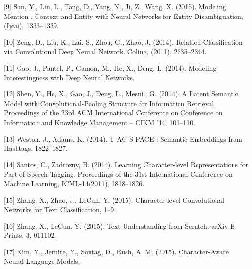 \documentclass{article}
\begin{document}
    [9] Sun, Y., Lin, L., Tang, D., Yang, N., Ji, Z.,  Wang, X. (2015). Modeling Mention , Context and Entity with Neural Networks for Entity Disambiguation, (Ijcai), 1333–1339.

    [10] Zeng, D., Liu, K., Lai, S., Zhou, G.,  Zhao, J. (2014). Relation Classification via Convolutional Deep Neural Network. Coling, (2011), 2335–2344. 

    [11] Gao, J., Pantel, P., Gamon, M., He, X.,  Deng, L. (2014). Modeling Interestingness with Deep Neural Networks.

    [12] Shen, Y., He, X., Gao, J., Deng, L.,  Mesnil, G. (2014). A Latent Semantic Model with Convolutional-Pooling Structure for Information Retrieval. Proceedings of the 23rd ACM International Conference on Conference on Information and Knowledge Management – CIKM ’14, 101–110.

    [13] Weston, J.,  Adams, K. (2014).  T AG S PACE : Semantic Embeddings from Hashtags, 1822–1827.

    [14] Santos, C.,  Zadrozny, B. (2014). Learning Character-level Representations for Part-of-Speech Tagging. Proceedings of the 31st International Conference on Machine Learning, ICML-14(2011), 1818–1826. 

    [15] Zhang, X., Zhao, J.,  LeCun, Y. (2015). Character-level Convolutional Networks for Text Classification, 1–9.

    [16] Zhang, X.,  LeCun, Y. (2015). Text Understanding from Scratch. arXiv E-Prints, 3, 011102.

    [17] Kim, Y., Jernite, Y., Sontag, D.,  Rush, A. M. (2015). Character-Aware Neural Language Models.
\end{document}
